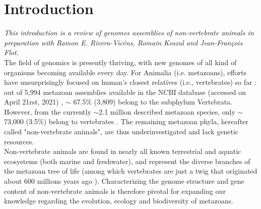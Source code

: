 
\chapter{Introduction}

\textit{This introduction is a review of genomes assemblies of non-vertebrate animals in preparation with Ramon E. Rivera-Vicéns, Romain Koszul and Jean-François Flot.} \\

The field of genomics is presently thriving, with new genomes of all kind of organisms becoming available every day. For Animalia (i.e. metazoans), efforts have unsurprisingly focused on human's closest relatives (i.e., vertebrates) so far \cite{rice2019}: out of 5,994 metazoan assemblies available in the NCBI database (accessed on April 21rst, 2021) \cite{ncbi}, $\sim$ 67.5\% (3,809) belong to the subphylum Vertebrata. However, from the currently $\sim$2.1 million described metazoan species, only $\sim$73,000 (3.5\%) belong to vertebrates \cite{red_list}. The remaining metazoan phyla, hereafter called "non-vertebrate animals", are thus underinvestigated and lack genetic resources. \\ 

Non-vertebrate animals are found in nearly all known terrestrial and aquatic ecosystems (both marine and freshwater), and represent the diverse branches of the metazoan tree of life (among which vertebrates are just a twig that originated about 600 millions years ago \cite{timetree}). Characterizing the genome structure and gene content of non-vertebrate animals is therefore pivotal for expanding our knowledge regarding the evolution, ecology and biodiversity of metazoans. \\


